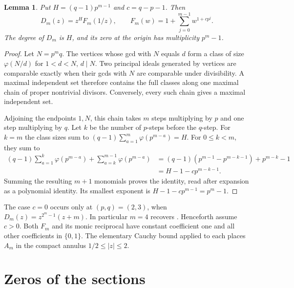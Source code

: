 \documentclass[11pt]{article}
\newtheorem{lemma}{Lemma}[section]
\begin{document}
\begin{lemma}\label{chains}
Put \(H=(q-1)p^{m-1}\) and \(c=q-p-1\). Then
\[
 D_m(z)=z^H F_m(1/z),\qquad F_m(w)=1+\sum_{j=0}^{m-1}w^{1+cp^j}.
\]
The degree of \(D_m\) is \(H\), and its zero at the origin has
multiplicity \(p^m-1\).
\end{lemma}
\begin{proof}
Let \(N=p^m q\). The vertices whose gcd with \(N\) equals \(d\)
form a class of size \(\varphi(N/d)\) for \(1<d<N\), \(d\mid N\).
Two principal ideals generated by vertices are comparable exactly when
their gcds with \(N\) are comparable under divisibility. A maximal
independent set therefore contains the full classes along one maximal
chain of proper nontrivial divisors. Conversely, every such chain
gives a maximal independent set.

Adjoining the endpoints \(1,N\), this chain takes \(m\) steps
multiplying by \(p\) and one step multiplying by \(q\). Let \(k\) be
the number of \(p\)-steps before the \(q\)-step. For \(k=m\) the
class sizes sum to \((q-1)\sum_{a=1}^{m}\varphi(p^{m-a})=H\). For
\(0\le k<m\), they sum to
\begin{align*}
(q-1)\sum_{a=1}^{k}\varphi(p^{m-a})
 + \sum_{a=k}^{m-1}\varphi(p^{m-a})
 &= (q-1)(p^{m-1}-p^{m-k-1})+p^{m-k}-1\\
 &=H-1-cp^{m-k-1}.
\end{align*}
Summing the resulting \(m+1\) monomials proves the identity, read
after expansion as a polynomial identity. Its smallest exponent is
\(H-1-cp^{m-1}=p^m-1\).
\end{proof}

The case \(c=0\) occurs only at \((p,q)=(2,3)\), when
\(D_m(z)=z^{2^m-1}(z+m)\). In particular \(m=4\) recovers
\cite[Example~2.2]{rather24}. Henceforth assume \(c>0\). Both
\(F_m\) and its monic reciprocal have constant coefficient one and all
other coefficients in \(\{0,1\}\). The elementary Cauchy bound applied
to each places \(A_m\) in the compact annulus \(1/2\le |z|\le2\).

\section{Zeros of the sections}
\end{document}
